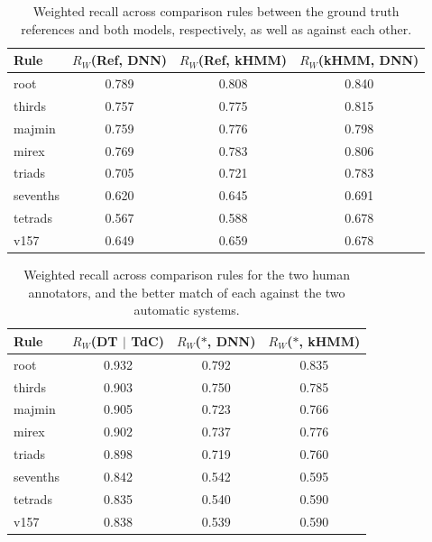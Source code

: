 \documentclass{article}
\begin{document}
\begin{table}[!t]
\scriptsize
\centering
\begin{tabular}{l||ccc}
Rule      & $R_W$(Ref, DNN) & $R_W$(Ref, kHMM) & $R_W$(kHMM, DNN) \\
\hline
root      & 0.789      & 0.808       & 0.840       \\
thirds    & 0.757      & 0.775       & 0.815       \\
majmin    & 0.759      & 0.776       & 0.798       \\
mirex     & 0.769      & 0.783       & 0.806       \\
triads    & 0.705      & 0.721       & 0.783       \\
sevenths  & 0.620      & 0.645       & 0.691       \\
tetrads   & 0.567      & 0.588       & 0.678       \\
v157      & 0.649      & 0.659       & 0.678       \\
\hline
\end{tabular}
\caption{Weighted recall across comparison rules between the ground truth references and both models, respectively, as well as against each other.}
\label{tab:test_performance}
\end{table}

\begin{table}[!t]
\scriptsize
\centering
\begin{tabular}{l||ccc}
Rule       & $R_W$(DT $|$ TdC) & $R_W$($\ast$, DNN) & $R_W$($\ast$, kHMM) \\
\hline
root        & 0.932 & 0.792 & 0.835 \\
thirds      & 0.903 & 0.750 & 0.785 \\
majmin      & 0.905 & 0.723 & 0.766 \\
mirex       & 0.902 & 0.737 & 0.776 \\
triads      & 0.898 & 0.719 & 0.760 \\
sevenths    & 0.842 & 0.542 & 0.595 \\
tetrads     & 0.835 & 0.540 & 0.590 \\
v157        & 0.838 & 0.539 & 0.590 \\
\hline
\end{tabular}
\caption{Weighted recall across comparison rules for the two human annotators, and the better match of each against the two automatic systems.}
\label{tab:rc_performance}
\end{table}
\end{document}

